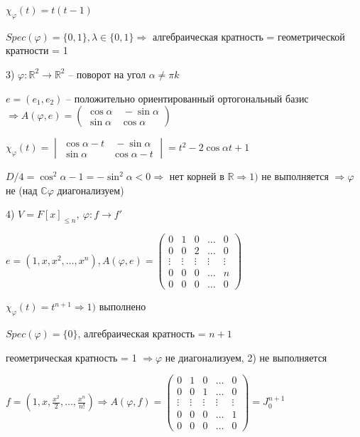$\chi_{\varphi} (t) = t (t - 1)$

$Spec(\varphi) = \{0, 1\}, \lambda \in \{0, 1\} \Rightarrow$ алгебраическая кратность = геометрической кратности = 1

3) $\varphi: \mathbb{R}^2 \rightarrow \mathbb{R}^2$ -- поворот на угол $\alpha \neq \pi k$

$e = (e_1, e_2)$ -- положительно ориентированный ортогональный базис $\Rightarrow A(\varphi, e) = \begin{pmatrix} \cos \alpha & \ - \sin \alpha \\ \sin \alpha & \cos \alpha \end{pmatrix}$

$\chi_{\varphi} (t) = \begin{vmatrix} \cos \alpha - t & \ -\sin \alpha \\ \sin \alpha & \cos \alpha - t \end{vmatrix} = t^2 - 2 \cos \alpha t + 1$

$D/4 = \cos^2 \alpha - 1 = -\sin^2 \alpha < 0 \Rightarrow$ нет корней в $\mathbb{R} \Rightarrow 1)$ не выполняется $\Rightarrow \varphi$ не (над $\mathbb{C} \varphi$ диагонализуем) 

4) $V = F[x]_{\leq n}, \ \varphi: f \rightarrow f'$

$e = (1, x, x^2, \dots, x^n), A(\varphi, e) = \begin{pmatrix} 0 & 1 & 0 & \dots & 0 \\ 0 & 0 & 2 & \dots & 0 \\ \vdots & \vdots & \vdots & \vdots & \vdots \\ 0 & 0 & 0 & \dots & n \\ 0 & 0 & 0 & \dots & 0
\end{pmatrix}$

$\chi_{\varphi} (t) = t^{n+1} \Rightarrow 1)$ выполнено

$Spec (\varphi) = \{0\}$, алгебраическая кратность = $n + 1$

геометрическая кратность = 1 $\Rightarrow \varphi$ не диагонализуем, 2) не выполняется

$f = (1, x, \frac{x^2}{2}, \dots, \frac{x^n}{n!}) \Rightarrow A(\varphi, f) = \begin{pmatrix} 0 & 1 & 0 & \dots & 0 \\ 0 & 0 & 1 & \dots & 0 \\ \vdots & \vdots & \vdots & \vdots & \vdots \\ 0 & 0 & 0 & \dots & 1 \\ 0 & 0 & 0 & \dots & 0 \end{pmatrix} = J_0^{n+1}$

